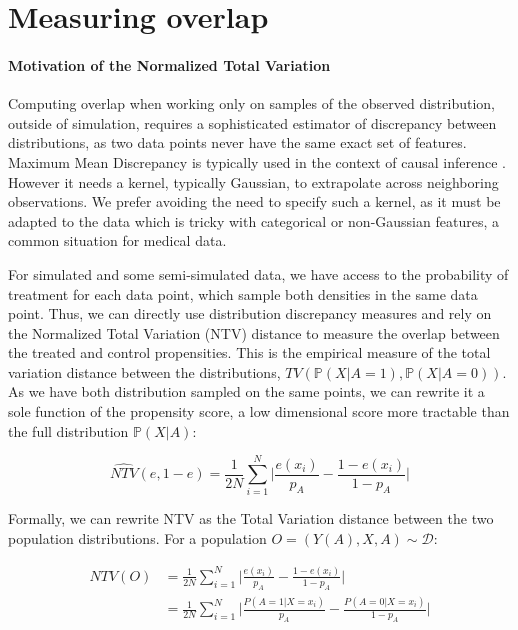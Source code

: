 \documentclass[10pt]{article}
\begin{document}
\section{Measuring overlap}\label{apd:motivation_ntv}

\paragraph{Motivation of the Normalized Total Variation}
Computing overlap when working only on samples of the observed distribution,
outside of simulation, requires a sophisticated estimator of discrepancy
between distributions, as two data points never have the same exact set of
features. Maximum Mean Discrepancy \cite{gretton2012kernel} is typically
used in the context of causal inference
\cite{shalit_estimating_2017,johansson_generalization_2021}. However it
needs a kernel, typically Gaussian, to extrapolate across neighboring
observations. We prefer avoiding the need to specify such a kernel, as it must
be adapted to the data which is tricky with categorical or non-Gaussian
features, a common situation for medical data.

For simulated and some semi-simulated data, we have access to the probability of
treatment for each data point, which sample both densities in the same data
point. Thus, we can directly use distribution discrepancy measures and rely on
the Normalized Total Variation (NTV) distance to measure the overlap between the
treated and control propensities. This is the empirical measure of the total
variation distance \cite{sriperumbudur_integral_2009} between the distributions,
$TV(\mathbb{P}(X|A=1), \mathbb{P}(X|A=0))$. As we have both distribution sampled
on the same points, we can rewrite it a sole function of the propensity score, a
low dimensional score more tractable than the full distribution $\mathbb
    P(X|A)$:

\begin{equation}\label{eq:ntv}
    \widehat{NTV}(e, 1-e) = \frac{1}{2N} \sum_{i =1}^{N} \big |\frac{e(x_i)}{p_A}-\frac{1-e(x_i)}{1-{p_A}} \big |
\end{equation}

Formally, we can rewrite NTV as the Total Variation distance
between the two population distributions. For a population $O = (Y(A), X, A)
    \sim \mathcal{D}$:

\begin{align*}
    NTV(O) & = \frac{1}{2N} \sum_{i =1}^{N} \big | \frac{e(x_i)}{p_A}-\frac{1-e(x_i)}{1-{p_A}} \big|         \\
           & = \frac{1}{2N} \sum_{i =1}^{N} \big|\frac{P(A=1|X=x_i)}{p_A}-\frac{P(A=0|X=x_i)}{1-{p_A}} \big|
\end{align*}
\end{document}
